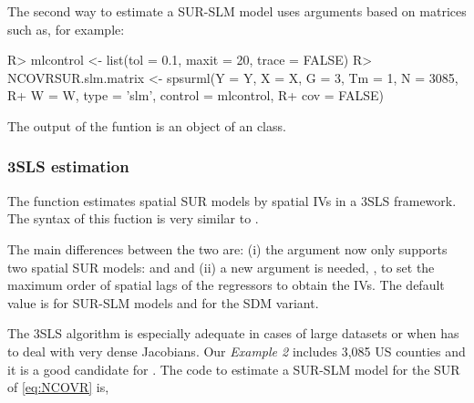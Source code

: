 \documentclass[article]{jss}
\begin{document}
The second way to estimate a SUR-SLM model uses arguments based on matrices such as, for example:

\begin{CodeChunk}

\begin{CodeInput}
R> mlcontrol <- list(tol = 0.1, maxit = 20, trace = FALSE)
R> NCOVRSUR.slm.matrix <- spsurml(Y = Y, X = X, G = 3, Tm = 1, N = 3085,
R+                              W = W, type = 'slm', control = mlcontrol, 
R+                              cov = FALSE)
\end{CodeInput}
\end{CodeChunk}

The output of the funtion  is an object of an  class.

\hypertarget{threesls}{%
\subsubsection{3SLS estimation}\label{threesls}}

The function  estimates spatial SUR models by spatial IVs in a 3SLS framework. The syntax of this fuction is very similar to .


The main differences between the two are: (i) the argument  now only supports two spatial SUR models:  and  and (ii) a new argument is needed, , to set the maximum order of spatial lags of the regressors to obtain the IVs. The default value is  for SUR-SLM models and  for the SDM variant.

The 3SLS algorithm is especially adequate in cases of large datasets or when  has to deal with very dense Jacobians. Our \emph{Example 2} includes 3,085 US counties and it is a good candidate for . The code to estimate a SUR-SLM model for the SUR of \eqref{eq:NCOVR} is,
\end{document}
